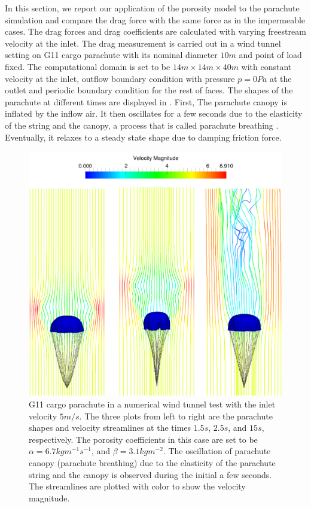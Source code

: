 In this section, we report our application of
the porosity model to the parachute simulation and compare the drag force with 
the same force as in the impermeable cases. The drag forces and drag
coefficients are calculated with varying freestream velocity at the inlet.
The drag measurement is carried out in a wind tunnel setting on G11 cargo
parachute with its nominal diameter $10 m$ and point of load fixed. The computational  
domain is set to be $14 m\times14 m\times40 m$ with constant velocity at the inlet, 
outflow boundary condition with pressure $p = 0 Pa$ at the outlet and periodic boundary 
condition for the rest of faces. The shapes of the parachute at different times are 
displayed in . First, The parachute canopy is inflated by the 
inflow air. It then oscillates for a few seconds due to the elasticity of the string and the 
canopy, a process that is called parachute breathing \cite{roberts1974axisymmetric}. 
Eventually, it relaxes to a steady state shape due to damping friction force.

\begin{figure}[H] \centering
\includegraphics[width= 1.0\columnwidth]{Figures/drag_test} 
\caption{G11 cargo parachute in a numerical wind tunnel test
with the inlet velocity $5m/s$. The three plots from left to right are
the parachute shapes and velocity streamlines at 
the times $1.5s$, $2.5s$, and $15s$, respectively. The porosity 
coefficients in this case are set to be $\alpha = 6.7kgm^{-1}s^{-1}$, 
and $\beta = 3.1kgm^{-2}$. The oscillation of 
parachute canopy (parachute breathing) due to the elasticity of the parachute
string and the canopy is observed during the initial a few seconds. 
The streamlines are plotted with color 
to show the velocity magnitude.}
\label{fig:drag_test} \end{figure}

